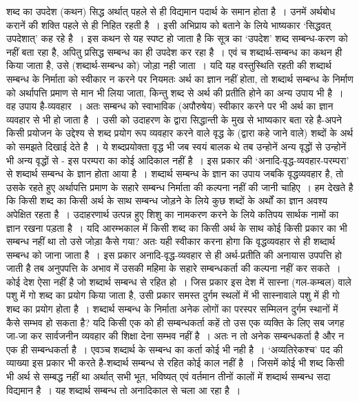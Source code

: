 शब्द का उपदेश (कथन) सिद्ध अर्थात् पहले से ही विद्यमान पदार्थ के समान होता है~। उनमें अर्थबोध करानें की शक्ति पहले से ही निहित रहती है~। इसी अभिप्राय को बताने के लिये भाष्यकार ‘सिद्धवत् उपदेशात्' कह रहे है~। इस कथन से यह स्पष्ट हो जाता है कि सूत्र का ‘उपदेश' शब्द सम्बन्ध-करण को नहीं बता रहा है, अपितु प्रसिद्ध सम्बन्ध का ही उपदेश कर रहा है~। एवं च शब्दार्थ-सम्बन्ध का कथन ही किया जाता है, उसे (शब्दार्थ-सम्बन्ध को) जोड़ा नही जाता~। यदि यह वस्तुस्थिति रहती की शब्दार्थ सम्बन्ध के निर्माता को स्वीकार न करने पर नियमतः अर्थ का ज्ञान नहीं होता, तो शब्दार्थ सम्बन्ध के निर्माण को अर्थापत्ति प्रमाण से मान भी लिया जाता, किन्तु शब्द से अर्थ की प्रतीति होने का अन्य उपाय भी है~। वह उपाय है-व्यवहार~। अतः सम्बन्ध को स्वाभाविक (अपौरुषेय) स्वीकार करने पर भी अर्थ का ज्ञान व्यवहार से भी हो जाता है~। उसी को उदाहरण के द्वारा सिद्धान्ती के मुख से भाष्यकार बता रहे है-अपने किसी प्रयोजन के उद्देश्य से शब्द प्रयोग रूप व्यवहार करने वाले वृद्ध के (द्वारा कहे जाने वाले) शब्दों के अर्थ को समझते दिखाई देते है~। ये शब्दप्रयोक्ता वृद्ध भी जब स्वयं बालक थे तब उन्होनें अन्य वृद्धों से उन्होनें भी अन्य वृद्धों से - इस परम्परा का कोई आदिकाल नहीं है~। इस प्रकार की ‘अनादि-वृद्ध-व्यवहार-परम्परा' से शब्दार्थ सम्बन्ध के ज्ञान होता आया है~। शब्दार्थ सम्बन्ध के ज्ञान का उपाय जबकि वृद्धव्यवहार है, तो उसके रहते हुए अर्थापत्ति प्रमाण के सहारे सम्बन्ध निर्माता की कल्पना नहीं की जानी चाहिए~। हम देखते है कि किसी शब्द का किसी अर्थ के साथ सम्बन्ध जोड़ने के लिये कुछ शब्दों के अर्थों का ज्ञान अवश्य अपेक्षित रहता है~। उदाहरणार्थ उत्पन्न हुए शिशु का नामकरण करने के लिये कतिपय सार्थक नामों का ज्ञान रखना पड़ता है~। यदि आरम्भकाल में किसी शब्द का किसी अर्थ के साथ कोई किसी प्रकार का भी सम्बन्ध नहीं था तो उसे जोड़ा कैसे गया? अतः यही स्वीकार करना होगा कि वृद्धव्यवहार से ही शब्दार्थ सम्बन्ध को जाना जाता है~। इस प्रकार अनादि-वृद्ध-व्यवहार से ही अर्थ-प्रतीति की अनायास उपपत्ति हो जाती है तब अनुपपत्ति के अभाव में उसकी महिमा के सहारे सम्बन्धकर्ता की कल्पना नहीं कर सकते~। कोई देश ऐसा नहीं है जो शब्दार्थ सम्बन्ध से रहित हो~। जिस प्रकार इस देश में सास्ना (गल-कम्बल) वाले पशु में गो शब्द का प्रयोग किया जाता है, उसी प्रकार समस्त दुर्गम स्थलों में भी सास्नावाले पशु में ही गो शब्द का प्रयोग होता है~। शब्दार्थ सम्बन्ध के निर्माता अनेक लोगों का परस्पर सम्मिलन दुर्गम स्थानों में कैसे सम्भव हो सकता है? यदि किसी एक को ही सम्बन्धकर्ता कहें तो उस एक व्यक्ति के लिए सब जगह जा-जा कर सार्वजनीन व्यवहार की शिक्षा देना सम्भव नहीं है~। अतः न तो अनेक सम्बन्धकर्ता है और न एक ही सम्बन्धकर्ता है~। एवञ्च शब्दार्थ के सम्बन्ध का कर्ता कोई भी नही है~। ‘अव्यतिरेकश्च' पद की व्याख्या इस प्रकार भी करते है-शब्दार्थ सम्बन्ध से रहित कोई काल नहीं है~। जिसमें कोई भी शब्द किसी भी अर्थ से सम्बद्ध नहीं था अर्थात् सभी भूत, भविष्यत् एवं वर्तमान तीनों कालों में शब्दार्थ सम्बन्ध सदा विद्यमान है~। यह शब्दार्थ सम्बन्ध तो अनादिकाल से चला आ रहा है~।

